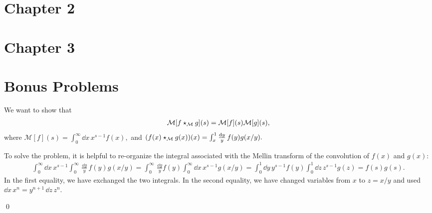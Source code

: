 \section*{Chapter 2}

\section*{Chapter 3}



\section*{Bonus Problems}


We want to show that
\begin{align*}
    \mathcal{M}[f \star_{\mathcal M} g](s) = \mathcal{M}[f](s) \mathcal{M}[g](s)
    ,
\end{align*}
where
\(
    \mathcal{M}[f](s) = \int_0^\infty \dd x\, x^{s-1} f(x)
    ,
\)
and
\(
    (f(x) \star_{\mathcal M} g(x))(x)
    =
    \int_x^1 \frac{\dd y}{y}\, f(y) g(x/y)
    .
\)


To solve the problem, it is helpful to re-organize the integral associated with the Mellin transform of the convolution of \(f(x)\) and \(g(x)\):
\begin{align*}
    \int_0^\infty \dd x\, x^{s-1}
    \int_0^\infty \,\frac{\dd y}{y}\,
    f(y) g(x/y)
    =
    \int_0^\infty \,\frac{\dd y}{y}
    f(y)
    \int_0^\infty \dd x\,
    x^{s-1} g(x/y)
    =
    \int_0^1 \dd y \, y^{s-1} f(y)
    \int_0^1 \dd z\, z^{s-1} g(z)
    =
    f(s) g(s)
    .
\end{align*}
In the first equality, we have exchanged the two integrals. %
%
In the second equality, we have changed variables from \(x\) to \(z = x/y\) and used \(\dd x\, x^n = y^{n+1}\, \dd z\, z^n\).

\qed{}

